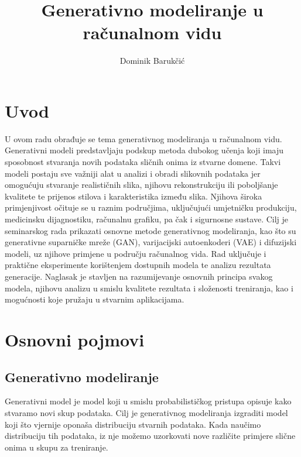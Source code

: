 \documentclass[times, utf8, seminar, numeric]{fer}
\begin{document}
	
	\nocite{*}
	
	\title{Generativno modeliranje u računalnom vidu}
	\author{Dominik Barukčić}
	
	\maketitle
	
	\tableofcontents
	
	\chapter{Uvod}
		U ovom radu obrađuje se tema generativnog modeliranja u računalnom vidu. Generativni modeli predstavljaju podskup metoda dubokog učenja koji imaju sposobnost stvaranja novih podataka sličnih onima iz stvarne domene. Takvi modeli postaju sve važniji alat u analizi i obradi slikovnih podataka jer omogućuju stvaranje realističnih slika, njihovu rekonstrukciju ili poboljšanje kvalitete te prijenos stilova i karakteristika između slika. Njihova široka primjenjivost očituje se u raznim područjima, uključujući umjetničku produkciju, medicinsku dijagnostiku, računalnu grafiku, pa čak i sigurnosne sustave. Cilj je seminarskog rada prikazati osnovne metode generativnog modeliranja, kao što su generativne suparničke mreže (GAN), varijacijski autoenkoderi (VAE) i difuzijski modeli, uz njihove primjene u području računalnog vida. Rad uključuje i praktične eksperimente korištenjem dostupnih modela te analizu rezultata generacije. Naglasak je stavljen na razumijevanje osnovnih principa svakog modela, njihovu analizu u smislu kvalitete rezultata i složenosti treniranja, kao i mogućnosti koje pružaju u stvarnim aplikacijama. 
	
	
	\chapter{Osnovni pojmovi}
		\section{Generativno modeliranje}
		Generativni model je model koji u smislu probabilističkog pristupa opisuje kako stvaramo novi skup podataka. Cilj je generativnog modeliranja izgraditi model koji što vjernije oponaša distribuciju stvarnih podataka. Kada naučimo distribuciju tih podataka, iz nje možemo uzorkovati nove različite primjere slične onima u skupu za treniranje.
		
\end{document}
